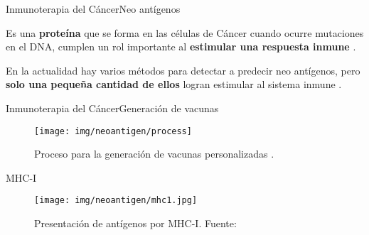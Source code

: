 \documentclass[10pt]{beamer}
\newcommand{\1}{
	\setbeamertemplate{background}{
		\texttt{[image: img/1]}
		\tikz[overlay] \fill[fill opacity=0.75,fill=white] (0,0) rectangle (-\paperwidth,\paperheight);
	}
}
\begin{document}
\begin{frame}{Inmunoterapia del Cáncer}{Neo antígenos}		
	\begin{block}{}
		Es una \textbf{proteína} que se forma en las células de Cáncer cuando ocurre mutaciones en el DNA, cumplen un rol importante al \textbf{estimular una respuesta inmune} \cite{NCIdictionary2022, borden2022cancer}.
	\end{block} 
	\begin{block}{}
		En la actualidad hay varios métodos para detectar a predecir neo antígenos, pero \textbf{solo una pequeña cantidad de ellos} logran estimular al sistema inmune \cite{chen2021challenges, hao2021improvement}.
	\end{block}
\end{frame}

\begin{frame}{Inmunoterapia del Cáncer}{Generación de vacunas}	
	\begin{figure}
		\texttt{[image: img/neoantigen/process]}
		\caption{Proceso para la generación de vacunas personalizadas \cite{peng2019neoantigen}.}
	\end{figure}		
\end{frame}


\begin{frame}{MHC-I}{}		
	\begin{figure}[H]
		\centering
		\texttt{[image: img/neoantigen/mhc1.jpg]}
		\caption{Presentación de antígenos por MHC-I. Fuente: \cite{zhang2019application}}
		\label{fig:mhc1}
	\end{figure}	
\end{frame}



\end{document}

